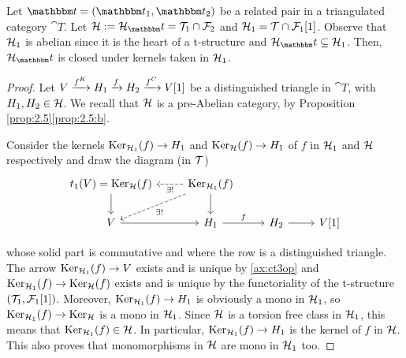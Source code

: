 \begin{lemma}\label{lem:thm:2.9}
  Let $\t= (\t_1,\t_2)$ be a related pair in a triangulated category $\cat{T}$. Let $\clH:=\clH_\t=\T_1\cap \F_2$ and $\mathcal{H}_1=\mathcal{T}\cap \mathcal{F}_1[1]$. Observe that $\mathcal{H}_1$ is abelian since it is the heart of a t-structure and $\clH_\t\subseteq \clH_1$. Then, $\clH_\t$ is closed under kernels taken in $\mathcal{H}_1$.
\end{lemma}
\begin{proof}
  Let $V\xrightarrow{f^K}H_1\xrightarrow{f}H_2\xrightarrow{f^C}V[1]$ be a distinguished triangle in $\cat{T}$, with $H_1,H_2\in\mathcal{H}$. We recall that $\mathcal{H}$ is a pre-Abelian category, by Proposition \ref{prop:2.5}\ref{prop:2.5:b}.

  Consider the kernels $\operatorname{Ker}_{\mathcal{H}_1}(f)\to H_1$ and $\operatorname{Ker}_{\mathcal{H}}(f)\to H_1$ of $f$ in $\mathcal{H}_1$ and $\mathcal{H}$ respectively and draw the diagram (in $\mathcal{T}$)
  \begin{equation*}
    \begin{tikzcd}
      t_1(V)=\Ker_\clH(f)\arrow{d}
      & \Ker_{\clH_1}(f)\arrow{d}\arrow[dashed]{dl}{\exists !}\arrow[dashed]{l}{\exists !}
        & &\\
      V\arrow{r}
      & H_1\arrow{r}{f}
      & H_2\arrow{r}
      & V[1]
    \end{tikzcd}
  \end{equation*}
  \begin{sloppypar}
    whose solid part is commutative and where the row is a distinguished triangle. The arrow $\operatorname{Ker}_{\mathcal{H}_1}(f)\to V$ exists and is unique by \ref{ax:ct3op} and $\operatorname{Ker}_{\mathcal{H}_1}(f)\to \operatorname{Ker}_{\mathcal{H}}(f)$ exists and is unique by the functoriality of the t-structure $(\mathcal{T}_1,\mathcal{F}_1[1])$. Moreover, ${\operatorname{Ker}_{\mathcal{H}_1}(f) \to H_1}$ is obviously a mono in $\mathcal{H}_1$, so ${\operatorname{Ker}_{\mathcal{H}_1}(f)\to \operatorname{Ker}_{\mathcal{H}}}$ is a mono in $\mathcal{H}_1$. Since $\mathcal{H}$ is a torsion free class in $\mathcal{H}_1$, this means that $\operatorname{Ker}_{\mathcal{H}_1}(f)\in\mathcal{H}$. In particular, $\operatorname{Ker}_{\mathcal{H}_1}(f)\to H_1$ is the kernel of $f$ in $\mathcal{H}$. This also proves that monomorphisms in $\mathcal{H}$ are mono in $\mathcal{H}_1$ too.
\end{sloppypar}
\end{proof}


